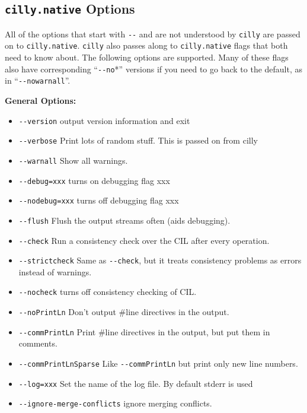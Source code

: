 \documentclass[letterpaper]{article}
\def\t#1{{\tt #1}}
\begin{document}
  \subsection{\t{cilly.native} Options}
  \label{sec-cilly.native-options}

 All of the options that start with \t{-{}-} and are not understood by
\t{cilly} are passed on to \t{cilly.native}. \t{cilly} also passes along to
\t{cilly.native} flags that both need to know
about.  The following options are supported.  Many of these flags also
have corresponding ``\t{-{}-no}*'' versions if you need to go back to
the default, as in ``\t{-{}-nowarnall}''.

\hspace*{2cm} {\bf General Options:}
\begin{itemize}
  \item \t{-{}-version} output version information and exit
  \item \t{-{}-verbose} Print lots of random stuff. This is passed on from cilly
  \item \t{-{}-warnall} Show all warnings.
  \item \t{-{}-debug=xxx} turns on debugging flag xxx
  \item \t{-{}-nodebug=xxx} turns off debugging flag xxx
  \item \t{-{}-flush} Flush the output streams often (aids debugging).
  \item \t{-{}-check} Run a consistency check over the CIL after every operation.
  \item \t{-{}-strictcheck} Same as \t{-{}-check}, but it treats
    consistency problems as errors instead of warnings.
  \item \t{-{}-nocheck} turns off consistency checking of CIL.
  \item \t{-{}-noPrintLn} Don't output \#line directives in the output.
  \item \t{-{}-commPrintLn} Print \#line directives in the output, but
    put them in comments.
  \item \t{-{}-commPrintLnSparse} Like \t{-{}-commPrintLn} but print only new
         line numbers.
  \item \t{-{}-log=xxx} Set the name of the log file.  By default stderr is used
  \item \t{-{}-ignore-merge-conflicts} ignore merging conflicts.

\end{itemize}
\end{document}
